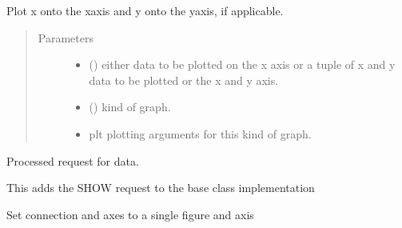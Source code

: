 \documentclass[letterpaper,10pt,english]{sphinxmanual}
\begin{document}
\begin{fulllineitems}
\begin{fulllineitems}
\label{\detokenize{dalio.external:dalio.external.image.PyPlotGraph.plot}}
Plot x onto the x\sphinxhyphen{}axis and y onto the y\sphinxhyphen{}axis, if applicable.
\begin{quote}\begin{description}
\item[{Parameters}] \leavevmode\begin{itemize}
\item {} 
 () \textendash{} either data to be plotted on the x
axis or a tuple of x and y data to be plotted or the x and y
axis.

\item {} 
 () \textendash{} kind of graph.

\item {} 
 \textendash{} plt plotting arguments for this kind of graph.

\end{itemize}

\end{description}\end{quote}

\end{fulllineitems}


\begin{fulllineitems}
\label{\detokenize{dalio.external:dalio.external.image.PyPlotGraph.request}}
Processed request for data.

This adds the SHOW request to the base class implementation

\end{fulllineitems}


\begin{fulllineitems}
\label{\detokenize{dalio.external:dalio.external.image.PyPlotGraph.reset}}
Set connection and axes to a single figure and axis

\end{fulllineitems}


\end{fulllineitems}
\end{document}
